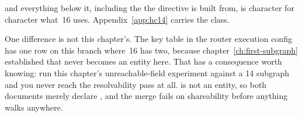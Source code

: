 \begin{onhc14}
and everything below it, including the  the
directive is built from, is character for character what~16 uses.
Appendix~\ref{app:hc14} carries the class.

One difference is not this chapter's. The key table in the router execution
config has one row on this branch where~16 has two, because
chapter~\ref{ch:first-subgraph} established that  never becomes
an entity here. That has a consequence worth knowing: run this chapter's
unreachable-field experiment against a 14 subgraph and you never reach the
resolvability pass at all.  is not an entity, so both documents
merely declare , and the merge fails on shareability before
anything walks anywhere.
\end{onhc14}
%
